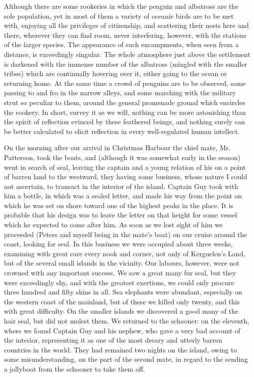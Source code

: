 Although there are some rookeries in which the penguin and albatross are the
sole population, yet in most of them a variety of oceanic birds are to be met
with, enjoying all the privileges of citizenship, and scattering their nests
here and there, wherever they can find room, never interfering, however, with
the stations of the larger species. The appearance of such encampments, when
seen from a distance, is exceedingly singular. The whole atmosphere just above
the settlement is darkened with the immense number of the albatross (mingled
with the smaller tribes) which are continually hovering over it, either going to
the ocean or returning home. At the same time a crowd of penguins are to be
observed, some passing to and fro in the narrow alleys, and some marching with
the military strut so peculiar to them, around the general promenade ground
which encircles the rookery. In short, survey it as we will, nothing can be more
astonishing than the spirit of reflection evinced by these feathered beings, and
nothing surely can be better calculated to elicit reflection in every
well-regulated human intellect. 

On the morning after our arrival in Christmas Harbour the chief mate, Mr.
Patterson, took the boats, and (although it was somewhat early in the season)
went in search of seal, leaving the captain and a young relation of his on a
point of barren land to the westward, they having some business, whose nature I
could not ascertain, to transact in the interior of the island. Captain Guy took
with him a bottle, in which was a sealed letter, and made his way from the point
on which he was set on shore toward one of the highest peaks in the place. It is
probable that his design was to leave the letter on that height for some vessel
which he expected to come after him. As soon as we lost sight of him we
proceeded (Peters and myself being in the mate's boat) on our cruise around the
coast, looking for seal. In this business we were occupied about three weeks,
examining with great care every nook and corner, not only of Kerguelen's Land,
but of the several small islands in the vicinity. Our labours, however, were not
crowned with any important success. We saw a great many fur seal, but they were
exceedingly shy, and with the greatest exertions, we could only procure three
hundred and fifty skins in all. Sea elephants were abundant, especially on the
western coast of the mainland, but of these we killed only twenty, and this with
great difficulty. On the smaller islands we discovered a good many of the hair
seal, but did not molest them. We returned to the schooner: on the eleventh,
where we found Captain Guy and his nephew, who gave a very bad account of the
interior, representing it as one of the most dreary and utterly barren countries
in the world. They had remained two nights on the island, owing to some
misunderstanding, on the part of the second mate, in regard to the sending a
jollyboat from the schooner to take them off. 


